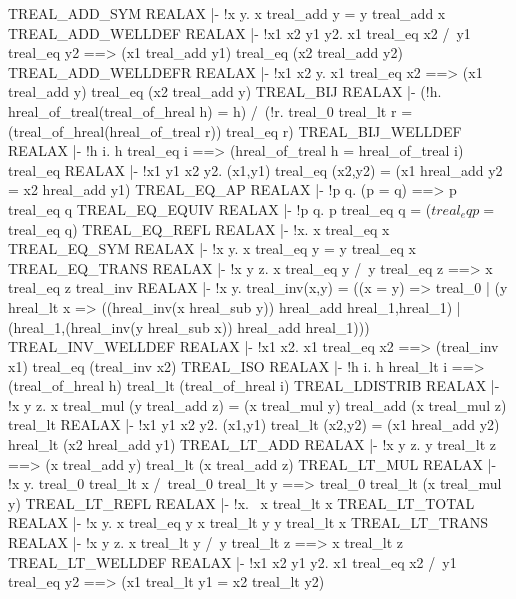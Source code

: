 \ENDTHEOREM
\THEOREM TREAL\_ADD\_SYM REALAX
|- !x y. x treal_add y = y treal_add x
\ENDTHEOREM
\THEOREM TREAL\_ADD\_WELLDEF REALAX
|- !x1 x2 y1 y2.
    x1 treal_eq x2 /\ y1 treal_eq y2 ==>
    (x1 treal_add y1) treal_eq (x2 treal_add y2)
\ENDTHEOREM
\THEOREM TREAL\_ADD\_WELLDEFR REALAX
|- !x1 x2 y.
    x1 treal_eq x2 ==> (x1 treal_add y) treal_eq (x2 treal_add y)
\ENDTHEOREM
\THEOREM TREAL\_BIJ REALAX
|- (!h. hreal_of_treal(treal_of_hreal h) = h) /\
   (!r.
     treal_0 treal_lt r = (treal_of_hreal(hreal_of_treal r)) treal_eq r)
\ENDTHEOREM
\THEOREM TREAL\_BIJ\_WELLDEF REALAX
|- !h i. h treal_eq i ==> (hreal_of_treal h = hreal_of_treal i)
\ENDTHEOREM
\THEOREM treal\_eq REALAX
|- !x1 y1 x2 y2.
    (x1,y1) treal_eq (x2,y2) = (x1 hreal_add y2 = x2 hreal_add y1)
\ENDTHEOREM
\THEOREM TREAL\_EQ\_AP REALAX
|- !p q. (p = q) ==> p treal_eq q
\ENDTHEOREM
\THEOREM TREAL\_EQ\_EQUIV REALAX
|- !p q. p treal_eq q = ($treal_eq p = $treal_eq q)
\ENDTHEOREM
\THEOREM TREAL\_EQ\_REFL REALAX
|- !x. x treal_eq x
\ENDTHEOREM
\THEOREM TREAL\_EQ\_SYM REALAX
|- !x y. x treal_eq y = y treal_eq x
\ENDTHEOREM
\THEOREM TREAL\_EQ\_TRANS REALAX
|- !x y z. x treal_eq y /\ y treal_eq z ==> x treal_eq z
\ENDTHEOREM
\THEOREM treal\_inv REALAX
|- !x y.
    treal_inv(x,y) =
    ((x = y) =>
     treal_0 |
     (y hreal_lt x =>
      ((hreal_inv(x hreal_sub y)) hreal_add hreal_1,hreal_1) |
      (hreal_1,(hreal_inv(y hreal_sub x)) hreal_add hreal_1)))
\ENDTHEOREM
\THEOREM TREAL\_INV\_WELLDEF REALAX
|- !x1 x2. x1 treal_eq x2 ==> (treal_inv x1) treal_eq (treal_inv x2)
\ENDTHEOREM
\THEOREM TREAL\_ISO REALAX
|- !h i. h hreal_lt i ==> (treal_of_hreal h) treal_lt (treal_of_hreal i)
\ENDTHEOREM
\THEOREM TREAL\_LDISTRIB REALAX
|- !x y z.
    x treal_mul (y treal_add z) =
    (x treal_mul y) treal_add (x treal_mul z)
\ENDTHEOREM
\THEOREM treal\_lt REALAX
|- !x1 y1 x2 y2.
    (x1,y1) treal_lt (x2,y2) =
    (x1 hreal_add y2) hreal_lt (x2 hreal_add y1)
\ENDTHEOREM
\THEOREM TREAL\_LT\_ADD REALAX
|- !x y z. y treal_lt z ==> (x treal_add y) treal_lt (x treal_add z)
\ENDTHEOREM
\THEOREM TREAL\_LT\_MUL REALAX
|- !x y.
    treal_0 treal_lt x /\ treal_0 treal_lt y ==>
    treal_0 treal_lt (x treal_mul y)
\ENDTHEOREM
\THEOREM TREAL\_LT\_REFL REALAX
|- !x. ~x treal_lt x
\ENDTHEOREM
\THEOREM TREAL\_LT\_TOTAL REALAX
|- !x y. x treal_eq y \/ x treal_lt y \/ y treal_lt x
\ENDTHEOREM
\THEOREM TREAL\_LT\_TRANS REALAX
|- !x y z. x treal_lt y /\ y treal_lt z ==> x treal_lt z
\ENDTHEOREM
\THEOREM TREAL\_LT\_WELLDEF REALAX
|- !x1 x2 y1 y2.
    x1 treal_eq x2 /\ y1 treal_eq y2 ==>
    (x1 treal_lt y1 = x2 treal_lt y2)
\ENDTHEOREM
